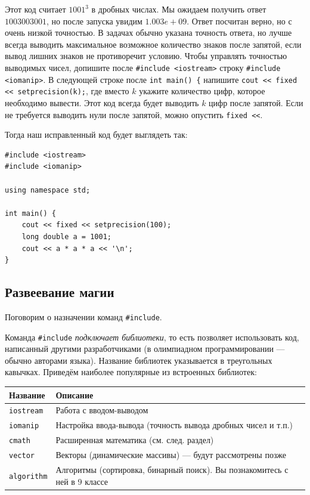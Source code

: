 \documentclass{article}
\begin{document}
	Этот код считает $1001^3$ в дробных числах. Мы ожидаем получить ответ $1003003001$, но после запуска увидим $1.003e+09$. Ответ посчитан верно, но с очень низкой точностью. В задачах обычно указана точность ответа, но лучше всегда выводить максимальное возможное количество знаков после запятой, если вывод лишних знаков не противоречит условию. Чтобы управлять точностью выводимых чисел, допишите после \texttt{\#include <iostream>} строку \texttt{\#include <iomanip>}. В следующей строке после \texttt{int main() \{} напишите \texttt{cout << fixed << setprecision(k);}, где вместо $k$ укажите количество цифр, которое необходимо вывести. Этот код всегда будет выводить $k$ цифр после запятой. Если не требуется выводить нули после запятой, можно опустить \texttt{fixed <<}.
	
	Тогда наш исправленный код будет выглядеть так:
	
	\begin{lstlisting}
#include <iostream>
#include <iomanip>

using namespace std;

int main() {
	cout << fixed << setprecision(100);
	long double a = 1001;
	cout << a * a * a << '\n';
}
	\end{lstlisting}
	
	\subsection{Развеевание магии}
	
	Поговорим о назначении команд \texttt{\#include}.
	
	Команда \texttt{\#include} \textit{подключает библиотеки}, то есть позволяет использовать код, написанный другими разработчиками (в олимпиадном программировании --- обычно авторами языка). Название библиотек указывается в треугольных кавычках. Приведём наиболее популярные из встроенных библиотек:
	
	\begin{tabularx}{\textwidth}{|X|X|}
		\hline
		\textbf{Название} & \textbf{Описание}\\
		\hline
		\texttt{iostream} & Работа с вводом-выводом\\
		\hline
		\texttt{iomanip} & Настройка ввода-вывода (точность вывода дробных чисел и т.п.)\\
		\hline
		\texttt{cmath} & Расширенная математика (см. след. раздел)\\
		\hline
		\texttt{vector} & Векторы (динамические массивы) --- будут рассмотрены позже\\
		\hline
		\texttt{algorithm} & Алгоритмы (сортировка, бинарный поиск). Вы познакомитесь с ней в 9 классе\\
		\hline
	\end{tabularx}
	
\end{document}
